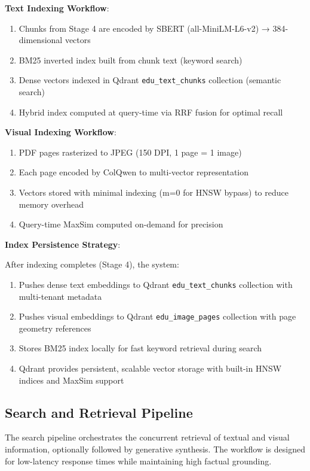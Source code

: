 \textbf{Text Indexing Workflow}:
\begin{enumerate}
    \item Chunks from Stage 4 are encoded by SBERT (all-MiniLM-L6-v2) → 384-dimensional vectors
    \item BM25 inverted index built from chunk text (keyword search)
    \item Dense vectors indexed in Qdrant \texttt{edu\_text\_chunks} collection (semantic search)
    \item Hybrid index computed at query-time via RRF fusion for optimal recall
\end{enumerate}

\textbf{Visual Indexing Workflow}:
\begin{enumerate}
    \item PDF pages rasterized to JPEG (150 DPI, 1 page = 1 image)
    \item Each page encoded by ColQwen to multi-vector representation
    \item Vectors stored with minimal indexing (m=0 for HNSW bypass) to reduce memory overhead
    \item Query-time MaxSim computed on-demand for precision
\end{enumerate}

\textbf{Index Persistence Strategy}:

After indexing completes (Stage 4), the system:
\begin{enumerate}
    \item Pushes dense text embeddings to Qdrant \texttt{edu\_text\_chunks} collection with multi-tenant metadata
    \item Pushes visual embeddings to Qdrant \texttt{edu\_image\_pages} collection with page geometry references
    \item Stores BM25 index locally for fast keyword retrieval during search
    \item Qdrant provides persistent, scalable vector storage with built-in HNSW indices and MaxSim support
\end{enumerate}

\subsection{Search and Retrieval Pipeline}

The search pipeline orchestrates the concurrent retrieval of textual and visual information, optionally followed by generative synthesis. The workflow is designed for low-latency response times while maintaining high factual grounding.

